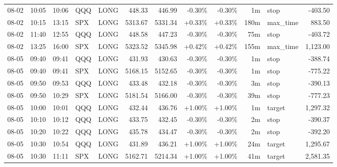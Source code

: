 \documentclass[11pt,a4paper,twoside]{article}
\begin{document}
\begin{center}
\begin{longtable}{>{\color{txtmain}}l l l l l r r r r r >{\color{txtmain}}l r}
08-02 & 10:05 & 10:06 & QQQ & LONG & 448.33 & 446.99 & \textcolor{lossred}{-0.30\%} & \textcolor{lossred}{-0.30\%} & 1m & stop & \textcolor{lossred}{-403.50} \\
08-02 & 10:15 & 13:15 & SPX & LONG & 5313.67 & 5331.34 & \textcolor{wingreen}{+0.33\%} & \textcolor{wingreen}{+0.33\%} & 180m & max\_time & \textcolor{wingreen}{883.50} \\
08-02 & 11:40 & 12:55 & QQQ & LONG & 448.58 & 447.23 & \textcolor{lossred}{-0.30\%} & \textcolor{lossred}{-0.30\%} & 75m & stop & \textcolor{lossred}{-403.72} \\
08-02 & 13:25 & 16:00 & SPX & LONG & 5323.52 & 5345.98 & \textcolor{wingreen}{+0.42\%} & \textcolor{wingreen}{+0.42\%} & 155m & max\_time & \textcolor{wingreen}{1,123.00} \\
08-05 & 09:40 & 09:41 & QQQ & LONG & 431.93 & 430.63 & \textcolor{lossred}{-0.30\%} & \textcolor{lossred}{-0.30\%} & 1m & stop & \textcolor{lossred}{-388.74} \\
08-05 & 09:40 & 09:41 & SPX & LONG & 5168.15 & 5152.65 & \textcolor{lossred}{-0.30\%} & \textcolor{lossred}{-0.30\%} & 1m & stop & \textcolor{lossred}{-775.22} \\
08-05 & 09:50 & 09:53 & QQQ & LONG & 433.48 & 432.18 & \textcolor{lossred}{-0.30\%} & \textcolor{lossred}{-0.30\%} & 3m & stop & \textcolor{lossred}{-390.13} \\
08-05 & 09:50 & 10:29 & SPX & LONG & 5181.54 & 5166.00 & \textcolor{lossred}{-0.30\%} & \textcolor{lossred}{-0.30\%} & 39m & stop & \textcolor{lossred}{-777.23} \\
08-05 & 10:00 & 10:01 & QQQ & LONG & 432.44 & 436.76 & \textcolor{wingreen}{+1.00\%} & \textcolor{wingreen}{+1.00\%} & 1m & target & \textcolor{wingreen}{1,297.32} \\
08-05 & 10:10 & 10:12 & QQQ & LONG & 433.75 & 432.45 & \textcolor{lossred}{-0.30\%} & \textcolor{lossred}{-0.30\%} & 2m & stop & \textcolor{lossred}{-390.37} \\
08-05 & 10:20 & 10:22 & QQQ & LONG & 435.78 & 434.47 & \textcolor{lossred}{-0.30\%} & \textcolor{lossred}{-0.30\%} & 2m & stop & \textcolor{lossred}{-392.20} \\
08-05 & 10:30 & 10:54 & QQQ & LONG & 431.89 & 436.21 & \textcolor{wingreen}{+1.00\%} & \textcolor{wingreen}{+1.00\%} & 24m & target & \textcolor{wingreen}{1,295.67} \\
08-05 & 10:30 & 11:11 & SPX & LONG & 5162.71 & 5214.34 & \textcolor{wingreen}{+1.00\%} & \textcolor{wingreen}{+1.00\%} & 41m & target & \textcolor{wingreen}{2,581.35} \\

\end{longtable}
\end{center}
\end{document}
